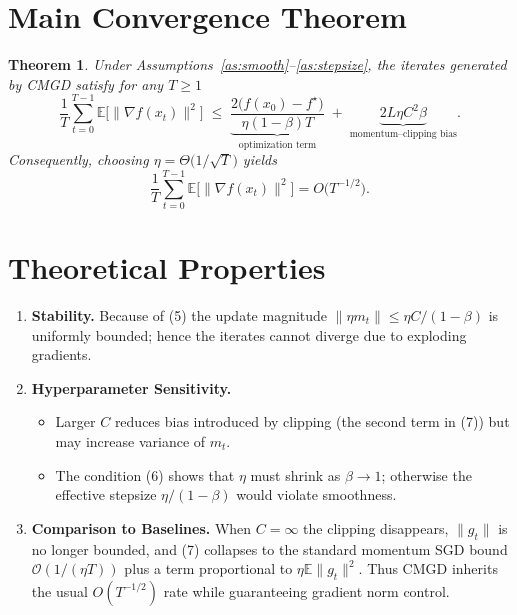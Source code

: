 \documentclass{article}
\newtheorem{theorem}{Theorem}
\begin{document}
\section*{Main Convergence Theorem}
\begin{theorem}\label{thm:main}
Under Assumptions~\ref{as:smooth}–\ref{as:stepsize}, the iterates generated
by CMGD satisfy for any $T\ge1$
\[
\frac{1}{T}\sum_{t=0}^{T-1}\mathbb{E}\!\bigl[\|\nabla f(x_t)\|^2\bigr]
\;\le\;
\underbrace{\frac{2\bigl(f(x_0)-f^\star\bigr)}{\eta(1-\beta)T}}_{\displaystyle\text{optimization term}}
\;+\;
\underbrace{2L\eta C^2\beta}_{\displaystyle\text{momentum–clipping bias}} .
\tag{7}
\]
Consequently, choosing $\eta = \Theta\!\bigl(1/\sqrt{T}\bigr)$ yields
\[
\frac{1}{T}\sum_{t=0}^{T-1}\mathbb{E}\!\bigl[\|\nabla f(x_t)\|^2\bigr]
=O\!\bigl(T^{-1/2}\bigr).
\]
\end{theorem}

\section*{Theoretical Properties}
\begin{enumerate}
\item \textbf{Stability.} Because of (5) the update magnitude
$\|\eta m_t\|\le \eta C/(1-\beta)$ is uniformly bounded; hence the iterates
cannot diverge due to exploding gradients.

\item \textbf{Hyperparameter Sensitivity.}
\begin{itemize}
\item Larger $C$ reduces bias introduced by clipping (the second term in (7))
but may increase variance of $m_t$.
\item The condition (6) shows that $\eta$ must shrink as $\beta\to1$;
otherwise the effective stepsize $\eta/(1-\beta)$ would violate smoothness.
\end{itemize}

\item \textbf{Comparison to Baselines.}
When $C=\infty$ the clipping disappears, $\|g_t\|$ is no longer bounded,
and (7) collapses to the standard momentum SGD bound
$\mathcal{O}(1/(\eta T))$ plus a term proportional to $\eta\mathbb{E}\|g_t\|^2$.
Thus CMGD inherits the usual $O(T^{-1/2})$ rate while guaranteeing
gradient norm control.
\end{enumerate}
\end{document}
